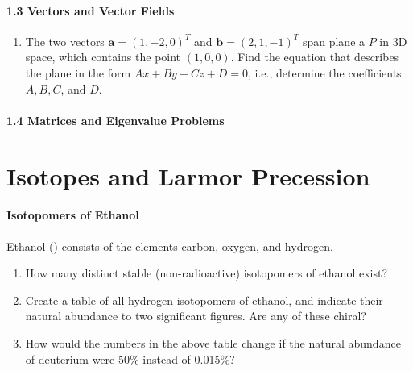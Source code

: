\documentclass{chem6155problemset}
\begin{document}
\paragraph{1.3 Vectors and Vector Fields}
\begin{enumerate}[resume]
  \item The two vectors $\mathbf{a}=(1,-2,0)^T$ and $\mathbf{b}=(2,1,-1)^T$ span 
    plane a $P$ in 3D space, which contains the point $(1,0,0)$. Find
    the equation that describes the plane in the form $Ax+By+Cz+D=0$, i.e., determine
    the coefficients $A,B,C$, and $D$. 
\end{enumerate}

\paragraph{1.4 Matrices and Eigenvalue Problems}

\section{Isotopes and Larmor Precession}
\paragraph{Isotopomers of Ethanol}
	Ethanol () consists of the elements carbon, oxygen, and hydrogen.
	\begin{enumerate}
	\item How many distinct stable (non-radioactive) isotopomers of ethanol exist? 
	\item Create a table of all hydrogen isotopomers of ethanol, and indicate 
	their natural abundance to two significant figures. Are any of these chiral?
	\item How would the numbers in the above table change if the natural abundance
	of deuterium were 50\% instead of 0.015\%?
	\end{enumerate}

	
\end{document}
